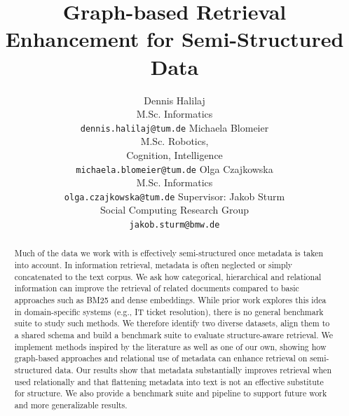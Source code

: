 \documentclass[11pt]{article}
\title{Graph-based Retrieval Enhancement for Semi-Structured Data}
\author{
  Dennis Halilaj \\
   M.Sc. Informatics \\
  \texttt{dennis.halilaj@tum.de}
  \And
    Michaela Blomeier \\
  M.Sc. Robotics, \\
  Cognition, Intelligence \\
  \texttt{michaela.blomeier@tum.de}
  \And
  Olga Czajkowska \\
  M.Sc. Informatics \\
  \texttt{olga.czajkowska@tum.de}
  \AND
  Supervisor: Jakob Sturm \\
  Social Computing Research Group \\
  \texttt{jakob.sturm@bmw.de}
}
\begin{document}
\maketitle
\begin{abstract}
Much of the data we work with is effectively semi-structured once metadata is taken into account. In information retrieval, metadata is often neglected or simply concatenated to the text corpus. We ask how categorical, hierarchical and relational information can improve the retrieval of related documents compared to basic approaches such as BM25 and dense embeddings. While prior work explores this idea in domain-specific systems (e.g., IT ticket resolution), there is no general benchmark suite to study such methods. We therefore identify two diverse datasets, align them to a shared schema and build a benchmark suite to evaluate structure-aware retrieval. We implement methods inspired by the literature as well as one of our own, showing how graph-based approaches and relational use of metadata can enhance retrieval on semi-structured data. Our results show that metadata substantially improves retrieval when used relationally and that flattening metadata into text is not an effective substitute for structure. We also provide a benchmark suite and pipeline to support future work and more generalizable results.
\end{abstract}


\end{document}

